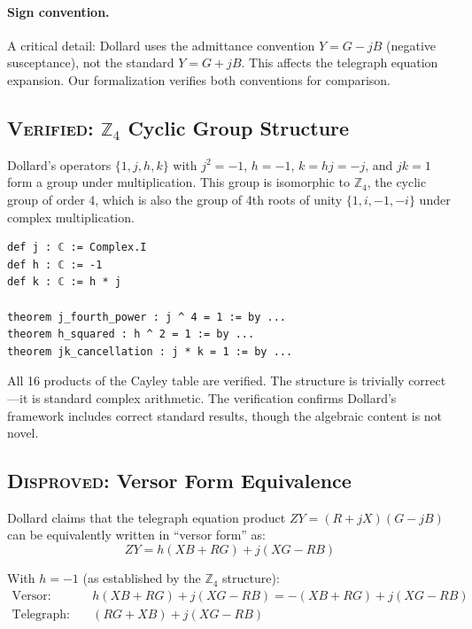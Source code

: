 \documentclass[runningheads]{llncs}
\begin{document}
\paragraph{Sign convention.} A critical detail: Dollard uses the admittance
convention $Y = G - jB$ (negative susceptance), not the standard $Y = G + jB$.
This affects the telegraph equation expansion. Our formalization verifies both
conventions for comparison.

\subsection{\textsc{Verified}: $\mathbb{Z}_4$ Cyclic Group Structure}

Dollard's operators $\{1, j, h, k\}$ with $j^2 = -1$, $h = -1$, $k = hj = -j$,
and $jk = 1$ form a group under multiplication. This group is isomorphic to
$\mathbb{Z}_4$, the cyclic group of order 4, which is also the group of 4th
roots of unity $\{1, i, -1, -i\}$ under complex multiplication.

\begin{lstlisting}[caption={Versor operators as 4th roots of unity (excerpt from \texttt{basic\_operators.lean})}]
def j : ℂ := Complex.I
def h : ℂ := -1
def k : ℂ := h * j

theorem j_fourth_power : j ^ 4 = 1 := by ...
theorem h_squared : h ^ 2 = 1 := by ...
theorem jk_cancellation : j * k = 1 := by ...
\end{lstlisting}

All 16 products of the Cayley table are verified. The structure is trivially
correct---it is standard complex arithmetic. The verification confirms Dollard's
framework includes correct standard results, though the algebraic content is
not novel.

\subsection{\textsc{Disproved}: Versor Form Equivalence}
\label{sec:disproof}

Dollard claims that the telegraph equation product $ZY = (R + jX)(G - jB)$ can
be equivalently written in ``versor form'' as:
\[
  ZY = h(XB + RG) + j(XG - RB)
\]

With $h = -1$ (as established by the $\mathbb{Z}_4$ structure):
\begin{align*}
  \text{Versor:} \quad & h(XB{+}RG) + j(XG{-}RB) = -(XB{+}RG) + j(XG{-}RB) \\
  \text{Telegraph:} \quad & (RG{+}XB) + j(XG{-}RB)
\end{align*}
\end{document}
